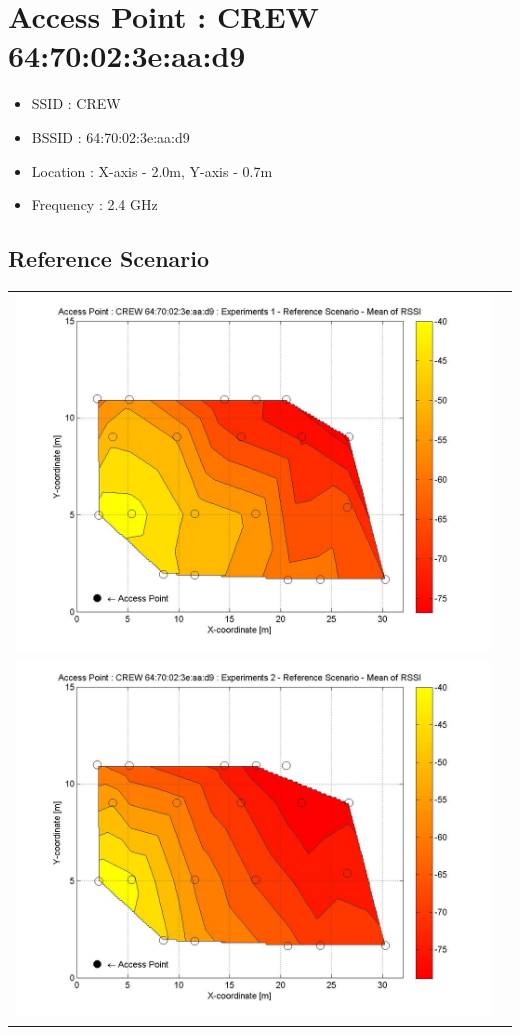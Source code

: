 \documentclass[11pt,a4paper,headinclude,footinclude,chapterprefix=on]{scrreprt}
\begin{document}
\begin{longtable}
\end{longtable}
\section{Access Point : CREW 64:70:02:3e:aa:d9} 
\begin{itemize}
	\item SSID : CREW 
	\item BSSID : 64:70:02:3e:aa:d9 
	\item Location : X-axis - 2.0m, Y-axis - 0.7m 
	\item Frequency : 2.4 GHz 
\end{itemize}
\subsection{Reference Scenario} 
\begin{longtable}
	{lr} 
	\includegraphics[width=13cm]{../../Source/plot/CREW_d9/d9_Ref_Ex_1_Mean.jpg} \\
	\includegraphics[width=13cm]{../../Source/plot/CREW_d9/d9_Ref_Ex_2_Mean.jpg} \\

\end{longtable}
\end{document}
